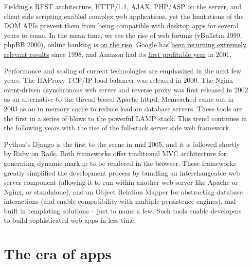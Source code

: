 \documentclass[12pt,letterpaper,fleqn]{article}
\newcommand{\jurl}[2]{\textcolor{myblue}{\href{#2}{#1}}}
\begin{document}
Fielding's REST architecture, HTTP/1.1, AJAX, PHP/ASP on the server, and client side scripting enabled complex web applications, yet the limitations of the DOM APIs prevent them from being compatible with desktop apps for several years to come. In the mean time, we see the rise of web forums (vBulletin 1999, phpBB 2000), online banking is \jurl{on the rise}{http://thefinancialbrand.com/25380/yodlee-history-of-internet-banking/}, Google has \jurl{been returning extremely relevant results}{http://www.google.com/about/company/history} since 1998, and Amazon had its \jurl{first profitable year}{http://en.wikipedia.org/wiki/Amazon.com} in 2001.

Performance and scaling of current technologies are emphasized in the next few years. The HAProxy TCP/IP load balancer was released in 2000. The Nginx event-driven asynchronous web server and reverse proxy was first released in 2002 as an alternative to the thread-based Apache httpd. Memcached came out in 2003 as an in memory cache to reduce load on database servers. These tools are the first in a series of blows to the powerful LAMP stack. This trend continues in the following years with the rise of the full-stack server side web framework.

Python's Django is the first to the scene in mid 2005, and it is followed shortly by Ruby on Rails. Both frameworks offer traditional MVC architecture for generating dynamic markup to be rendered in the browser. These frameworks greatly simplified the development process by bundling an interchangeable web server component (allowing it to run within another web server like Apache or Nginx, or standalone), and an Object Relation Mapper for abstracting database interactions (and enable compatibility with multiple persistence engines), and built in templating solutions -- just to name a few. Such tools enable developers to build sophisticated web apps in less time.

\section*{The era of apps}
\end{document}
